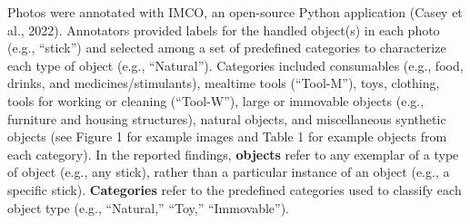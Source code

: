 \documentclass[10pt, letterpaper]{article}
\begin{document}
Photos were annotated with IMCO, an open-source Python application
(Casey et al., 2022). Annotators provided labels for the handled
object(s) in each photo (e.g., ``stick'') and selected among a set of
predefined categories to characterize each type of object (e.g.,
``Natural''). Categories included consumables (e.g., food, drinks, and
medicines/stimulants), mealtime tools (``Tool-M''), toys, clothing,
tools for working or cleaning (``Tool-W''), large or immovable objects
(e.g., furniture and housing structures), natural objects, and
miscellaneous synthetic objects (see Figure 1 for example images and
Table 1 for example objects from each category). In the reported
findings, \textbf{objects} refer to any exemplar of a type of object
(e.g., any stick), rather than a particular instance of an object (e.g.,
a specific stick). \textbf{Categories} refer to the predefined
categories used to classify each object type (e.g., ``Natural,''
``Toy,'' ``Immovable'').

\begin{table}[!ht]

\caption{\label{tab:top-objects}Number of unique objects (N) and objects handled by the most children, for each category, across sites.}
\centering
{}
\end{table}
\end{document}

